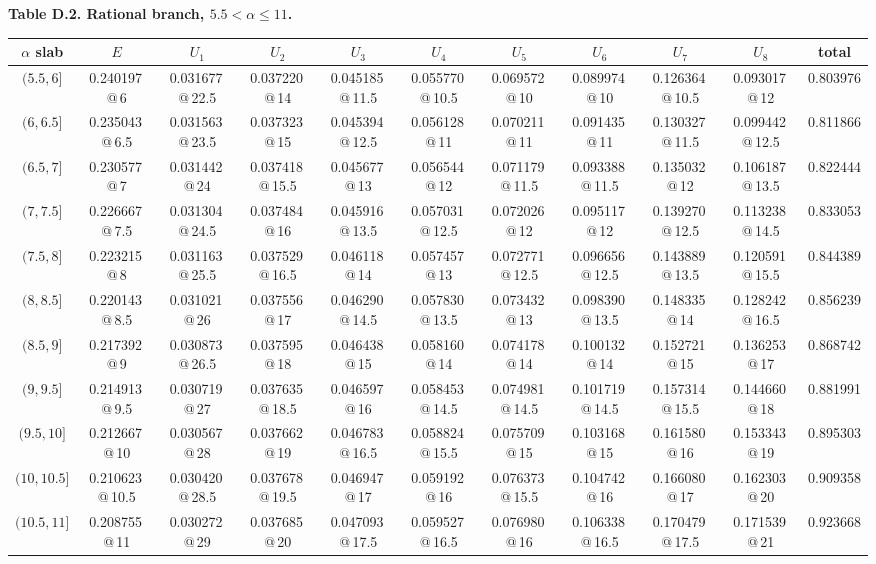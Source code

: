 \documentclass[11pt]{amsart}
\theoremstyle{definition}
\begin{document}
\begin{landscape}
\scriptsize
\setlength{\tabcolsep}{2.8pt}
\renewcommand{\arraystretch}{1.08}
\begin{center}
\textbf{Table D.2. Rational branch, $5.5<\alpha\le11$.}\par\medskip
\begin{tabular}{c|c|cccccccc|c}
\toprule
$\alpha$ slab & $E$ & $U_1$ & $U_2$ & $U_3$ & $U_4$ & $U_5$ & $U_6$ & $U_7$ & $U_8$ & total\\
\midrule
$(5.5,6]$ & 0.240197\,@\,6 & 0.031677\,@\,22.5 & 0.037220\,@\,14 & 0.045185\,@\,11.5 & 0.055770\,@\,10.5 & 0.069572\,@\,10 & 0.089974\,@\,10 & 0.126364\,@\,10.5 & 0.093017\,@\,12 & 0.803976 \\
$(6,6.5]$ & 0.235043\,@\,6.5 & 0.031563\,@\,23.5 & 0.037323\,@\,15 & 0.045394\,@\,12.5 & 0.056128\,@\,11 & 0.070211\,@\,11 & 0.091435\,@\,11 & 0.130327\,@\,11.5 & 0.099442\,@\,12.5 & 0.811866 \\
$(6.5,7]$ & 0.230577\,@\,7 & 0.031442\,@\,24 & 0.037418\,@\,15.5 & 0.045677\,@\,13 & 0.056544\,@\,12 & 0.071179\,@\,11.5 & 0.093388\,@\,11.5 & 0.135032\,@\,12 & 0.106187\,@\,13.5 & 0.822444 \\
$(7,7.5]$ & 0.226667\,@\,7.5 & 0.031304\,@\,24.5 & 0.037484\,@\,16 & 0.045916\,@\,13.5 & 0.057031\,@\,12.5 & 0.072026\,@\,12 & 0.095117\,@\,12 & 0.139270\,@\,12.5 & 0.113238\,@\,14.5 & 0.833053 \\
$(7.5,8]$ & 0.223215\,@\,8 & 0.031163\,@\,25.5 & 0.037529\,@\,16.5 & 0.046118\,@\,14 & 0.057457\,@\,13 & 0.072771\,@\,12.5 & 0.096656\,@\,12.5 & 0.143889\,@\,13.5 & 0.120591\,@\,15.5 & 0.844389 \\
$(8,8.5]$ & 0.220143\,@\,8.5 & 0.031021\,@\,26 & 0.037556\,@\,17 & 0.046290\,@\,14.5 & 0.057830\,@\,13.5 & 0.073432\,@\,13 & 0.098390\,@\,13.5 & 0.148335\,@\,14 & 0.128242\,@\,16.5 & 0.856239 \\
$(8.5,9]$ & 0.217392\,@\,9 & 0.030873\,@\,26.5 & 0.037595\,@\,18 & 0.046438\,@\,15 & 0.058160\,@\,14 & 0.074178\,@\,14 & 0.100132\,@\,14 & 0.152721\,@\,15 & 0.136253\,@\,17 & 0.868742 \\
$(9,9.5]$ & 0.214913\,@\,9.5 & 0.030719\,@\,27 & 0.037635\,@\,18.5 & 0.046597\,@\,16 & 0.058453\,@\,14.5 & 0.074981\,@\,14.5 & 0.101719\,@\,14.5 & 0.157314\,@\,15.5 & 0.144660\,@\,18 & 0.881991 \\
$(9.5,10]$ & 0.212667\,@\,10 & 0.030567\,@\,28 & 0.037662\,@\,19 & 0.046783\,@\,16.5 & 0.058824\,@\,15.5 & 0.075709\,@\,15 & 0.103168\,@\,15 & 0.161580\,@\,16 & 0.153343\,@\,19 & 0.895303 \\
$(10,10.5]$ & 0.210623\,@\,10.5 & 0.030420\,@\,28.5 & 0.037678\,@\,19.5 & 0.046947\,@\,17 & 0.059192\,@\,16 & 0.076373\,@\,15.5 & 0.104742\,@\,16 & 0.166080\,@\,17 & 0.162303\,@\,20 & 0.909358 \\
$(10.5,11]$ & 0.208755\,@\,11 & 0.030272\,@\,29 & 0.037685\,@\,20 & 0.047093\,@\,17.5 & 0.059527\,@\,16.5 & 0.076980\,@\,16 & 0.106338\,@\,16.5 & 0.170479\,@\,17.5 & 0.171539\,@\,21 & 0.923668 \\
\bottomrule
\end{tabular}
\end{center}
\end{landscape}
\end{document}
